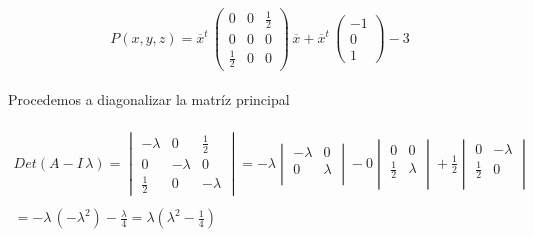 \documentclass[11pt,letterpaper]{article}
\begin{document}
    \,\\
    \begin{equation*}
        P(x,y,z)=\overline{x}^t\,\begin{pmatrix}
                0 & 0 & \frac{1}{2}\\
                0 & 0 & 0\\
                \frac{1}{2} & 0 & 0
                \end{pmatrix}\,\overline{x}+\overline{x}^t\,
                \begin{pmatrix}
                -1 \\
                0\\
                1
                \end{pmatrix}-3
    \end{equation*}\,\\
    Procedemos a diagonalizar la matr\'iz principal\,\\
    \,\\
    \begin{align*}
        Det(A-I\,\lambda)=
            \begin{vmatrix}
                -\lambda & 0 & \frac{1}{2}\\
                0& -\lambda & 0\\
                \frac{1}{2}& 0 & -\lambda
            \end{vmatrix}=-\lambda
            \begin{vmatrix}
                -\lambda & 0 \\
                0 & \lambda \\
                \end{vmatrix}
                -0
                \begin{vmatrix}
                0 & 0 \\
                \frac{1}{2} & \lambda \\
                \end{vmatrix}
                +\frac{1}{2}
                  \begin{vmatrix}
                0 & -\lambda \\
                \frac{1}{2} & 0\\
                \end{vmatrix}\,\\
                \,\\
                =-\lambda\,(-\lambda^2)-\frac{\lambda}{4}=\lambda(\lambda^2-\frac{1}{4})
    \end{align*}\,\\
\end{document}
